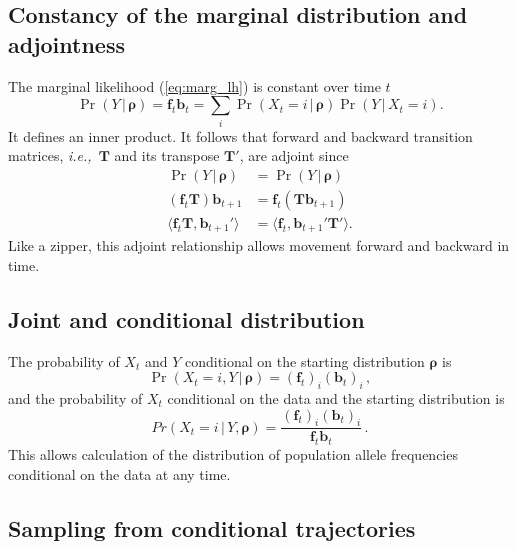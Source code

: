 \documentclass[preprint]{elsarticle}
\newcommand{\bs}[1]{\ensuremath{\boldsymbol{#1}}}
\newcommand\given{{\,|\,}}
\newcommand\ie{{\it i.e.,}}
\newcommand\x[1]{\ensuremath{X_{#1}}}
\newcommand\y{\ensuremath{Y}}
\newcommand\fv[1]{\ensuremath{\mathbf{f}_{#1}}}
\newcommand\bv[1]{\ensuremath{\mathbf{b}_{#1}}}
\begin{document}
\subsection{Constancy of the marginal distribution and adjointness}

The marginal likelihood (\ref{eq:marg_lh}) is constant over time $t$ 
\begin{equation}
\Pr(\y \given \bs{\rho}) = \fv{t}\bv{t} =\sum_i \Pr(\x{t}=i \given \bs{\rho}) \Pr(\y \given \x{t}=i).
\end{equation}
It defines an inner product. It follows that forward and backward transition matrices, \ie\ $\mathbf{T}$ and its transpose $\mathbf{T}'$, are adjoint since
\begin{equation}\label{eq:adjoint_discrete}
\begin{split}
\Pr(\y \given \bs{\rho})              &= \Pr(\y \given \bs{\rho}) \\
\left(\fv{t}\mathbf{T}\right)\bv{t+1} &= \fv{t}\left(\mathbf{T}\bv{t+1}\right) \\
\langle \fv{t}\mathbf{T},\bv{t+1}' \rangle   &= \langle  \fv{t},\bv{t+1}'\mathbf{T}' \rangle.
\end{split}
\end{equation}
Like a zipper, this adjoint relationship allows movement forward and backward in time.

\subsection{Joint and conditional distribution}

The probability of $\x{t}$ and $\y$ conditional on the starting distribution $\bs{\rho}$ is
\begin{equation}\label{eq:joint_xy_discr}
\Pr(\x{t}=i,\y \given \bs{\rho}) = (\fv{t})_i (\bv{t})_i\,,
\end{equation}
and the probability of $\x{t}$ conditional on the data and the starting distribution is
\begin{equation}\label{eq:cond_x|y_discr}
Pr(\x{t}=i \given \y,\bs{\rho}) = \frac{(\fv{t})_i (\bv{t})_i}{\fv{t}\bv{t}}\,.
\end{equation}
This allows calculation of the distribution of population allele frequencies conditional on the data at any time.

\subsection{Sampling from conditional trajectories}
\end{document}
